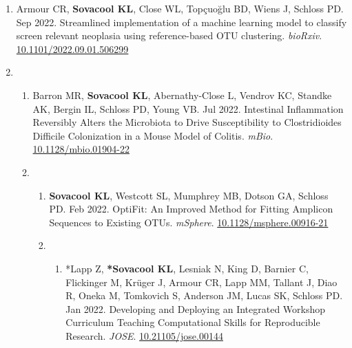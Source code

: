 \documentclass[12pt,a4paper,]{moderncv}
\providecommand{\tightlist}{%
	\setlength{\itemsep}{0pt}\setlength{\parskip}{0pt}}
\begin{document}
\begin{enumerate}
\def\labelenumi{\arabic{enumi}.}
\setcounter{enumi}{8}
\tightlist
\item
  Armour CR, \textbf{Sovacool KL}, Close WL, Topçuoğlu BD, Wiens J,
  Schloss PD. Sep 2022. Streamlined implementation of a machine learning
  model to classify screen relevant neoplasia using reference-based OTU
  clustering. \emph{bioRxiv}.
  \href{https://doi.org/10.1101/2022.09.01.506299}{10.1101/2022.09.01.506299}
  \newline  

  \item

  \begin{enumerate}
  \def\labelenumii{\arabic{enumii}.}
  \setcounter{enumii}{7}
  \tightlist
  \item
    Barron MR, \textbf{Sovacool KL}, Abernathy-Close L, Vendrov KC,
    Standke AK, Bergin IL, Schloss PD, Young VB. Jul 2022. Intestinal
    Inflammation Reversibly Alters the Microbiota to Drive
    Susceptibility to Clostridioides Difficile Colonization in a Mouse
    Model of Colitis. \emph{mBio}.
    \href{https://doi.org/10.1128/mbio.01904-22}{10.1128/mbio.01904-22}
    \newline  

    \item

    \begin{enumerate}
    \def\labelenumiii{\arabic{enumiii}.}
    \setcounter{enumiii}{6}
    \tightlist
    \item
      \textbf{Sovacool KL}, Westcott SL, Mumphrey MB, Dotson GA, Schloss
      PD. Feb 2022. OptiFit: An Improved Method for Fitting Amplicon
      Sequences to Existing OTUs. \emph{mSphere}.
      \href{https://doi.org/10.1128/msphere.00916-21}{10.1128/msphere.00916-21}
      \newline  

      \item

      \begin{enumerate}
      \def\labelenumiv{\arabic{enumiv}.}
      \setcounter{enumiv}{5}
      \tightlist
      \item
        *Lapp Z, \textbf{*Sovacool KL}, Lesniak N, King D, Barnier C,
        Flickinger M, Krüger J, Armour CR, Lapp MM, Tallant J, Diao R,
        Oneka M, Tomkovich S, Anderson JM, Lucas SK, Schloss PD. Jan
        2022. Developing and Deploying an Integrated Workshop Curriculum
        Teaching Computational Skills for Reproducible Research.
        \emph{JOSE}.
        \href{https://doi.org/10.21105/jose.00144}{10.21105/jose.00144}
        \newline  


\end{enumerate}
\end{enumerate}
\end{enumerate}
\end{enumerate}
\end{document}
